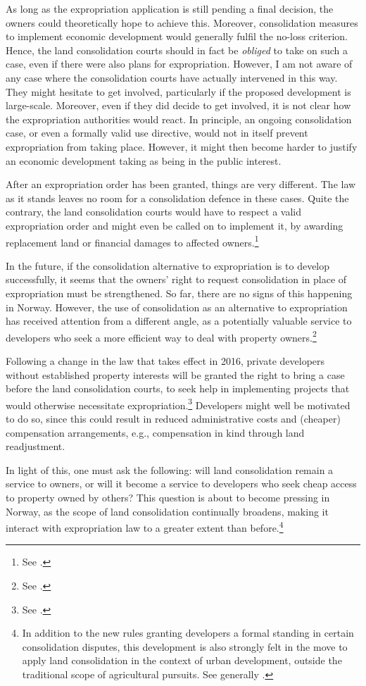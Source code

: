 As long as the expropriation application is still pending a final decision, the owners could theoretically hope to achieve this. Moreover, consolidation measures to implement economic development would generally fulfil the no-loss criterion. Hence, the land consolidation courts should in fact be {\it obliged} to take on such a case, even if there were also plans for expropriation. However, I am not aware of any case where the consolidation courts have actually intervened in this way. They might hesitate to get involved, particularly if the proposed development is large-scale. Moreover, even if they did decide to get involved, it is not clear how the expropriation authorities would react. In principle, an ongoing consolidation case, or even a formally valid use directive, would not in itself prevent expropriation from taking place. However, it might then become harder to justify an economic development taking as being in the public interest.

After an expropriation order has been granted, things are very different. The law as it stands leaves no room for a consolidation defence in these cases. Quite the contrary, the land consolidation courts would have to respect a valid expropriation order and might even be called on to implement it, by awarding replacement land or financial damages to affected owners.\footnote{See \dni\cite[6]{lca79}.}

In the future, if the consolidation alternative to expropriation is to develop successfully, it seems that the owners' right to request consolidation in place of expropriation must be strengthened. So far, there are no signs of this happening in Norway. However, the use of consolidation as an alternative to expropriation has received attention from a different angle, as a potentially valuable service to developers who seek a more efficient way to deal with property owners.\footnote{See \cite[84]{prop12}.}

Following a change in the law that takes effect in 2016, private developers without established property interests will be granted the right to bring a case before the land consolidation courts, to seek help in implementing projects that would otherwise necessitate expropriation.\footnote{See \dni\cite[1-5(3)]{lca13}.} Developers might well be motivated to do so, since this could result in reduced administrative costs and (cheaper) compensation arrangements, e.g., compensation in kind through land readjustment.

In light of this, one must ask the following: will land consolidation remain a service to owners, or will it become a service to developers who seek cheap access to property owned by others? This question is about to become pressing in Norway, as the scope of land consolidation continually broadens, making it interact with expropriation law to a greater extent than before.\footnote{In addition to the new rules granting developers a formal standing in certain consolidation disputes, this development is also strongly felt in the move to apply land consolidation in the context of urban development, outside the traditional scope of agricultural pursuits. See generally \cite{stenseth07}.}

